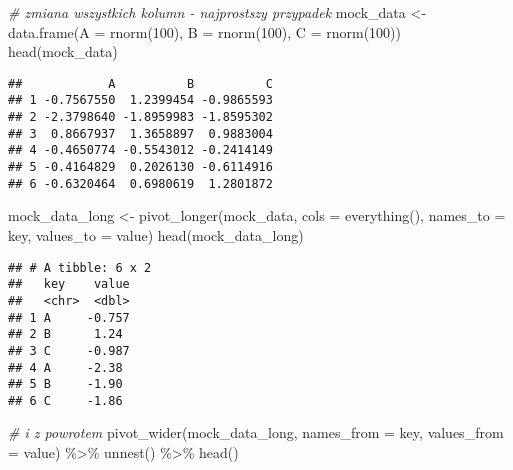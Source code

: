 \documentclass[
]{book}
\newenvironment{Shaded}{\begin{snugshade}}{\end{snugshade}}
\newcommand{\AttributeTok}[1]{\textcolor[rgb]{0.77,0.63,0.00}{#1}}
\newcommand{\CommentTok}[1]{\textcolor[rgb]{0.56,0.35,0.01}{\textit{#1}}}
\newcommand{\DecValTok}[1]{\textcolor[rgb]{0.00,0.00,0.81}{#1}}
\newcommand{\FunctionTok}[1]{\textcolor[rgb]{0.00,0.00,0.00}{#1}}
\newcommand{\NormalTok}[1]{#1}
\newcommand{\OtherTok}[1]{\textcolor[rgb]{0.56,0.35,0.01}{#1}}
\newcommand{\SpecialCharTok}[1]{\textcolor[rgb]{0.00,0.00,0.00}{#1}}
\newcommand{\StringTok}[1]{\textcolor[rgb]{0.31,0.60,0.02}{#1}}
\begin{document}
\begin{Shaded}
\begin{Highlighting}[]
\CommentTok{\# zmiana wszystkich kolumn {-} najprostszy przypadek}
\NormalTok{mock\_data }\OtherTok{\textless{}{-}} \FunctionTok{data.frame}\NormalTok{(}\AttributeTok{A =} \FunctionTok{rnorm}\NormalTok{(}\DecValTok{100}\NormalTok{), }\AttributeTok{B =} \FunctionTok{rnorm}\NormalTok{(}\DecValTok{100}\NormalTok{), }\AttributeTok{C =} \FunctionTok{rnorm}\NormalTok{(}\DecValTok{100}\NormalTok{))}
\FunctionTok{head}\NormalTok{(mock\_data)}
\end{Highlighting}
\end{Shaded}

\begin{verbatim}
##            A          B          C
## 1 -0.7567550  1.2399454 -0.9865593
## 2 -2.3798640 -1.8959983 -1.8595302
## 3  0.8667937  1.3658897  0.9883004
## 4 -0.4650774 -0.5543012 -0.2414149
## 5 -0.4164829  0.2026130 -0.6114916
## 6 -0.6320464  0.6980619  1.2801872
\end{verbatim}

\begin{Shaded}
\begin{Highlighting}[]
\NormalTok{mock\_data\_long }\OtherTok{\textless{}{-}} \FunctionTok{pivot\_longer}\NormalTok{(mock\_data, }\AttributeTok{cols =} \FunctionTok{everything}\NormalTok{(), }\AttributeTok{names\_to =} \StringTok{\textquotesingle{}key\textquotesingle{}}\NormalTok{, }\AttributeTok{values\_to =} \StringTok{\textquotesingle{}value\textquotesingle{}}\NormalTok{)}
\FunctionTok{head}\NormalTok{(mock\_data\_long)}
\end{Highlighting}
\end{Shaded}

\begin{verbatim}
## # A tibble: 6 x 2
##   key    value
##   <chr>  <dbl>
## 1 A     -0.757
## 2 B      1.24 
## 3 C     -0.987
## 4 A     -2.38 
## 5 B     -1.90 
## 6 C     -1.86
\end{verbatim}

\begin{Shaded}
\begin{Highlighting}[]
\CommentTok{\# i z powrotem}
\FunctionTok{pivot\_wider}\NormalTok{(mock\_data\_long, }\AttributeTok{names\_from =}\NormalTok{ key, }\AttributeTok{values\_from =}\NormalTok{ value) }\SpecialCharTok{\%\textgreater{}\%} \FunctionTok{unnest}\NormalTok{() }\SpecialCharTok{\%\textgreater{}\%} \FunctionTok{head}\NormalTok{()}
\end{Highlighting}
\end{Shaded}
\end{document}
